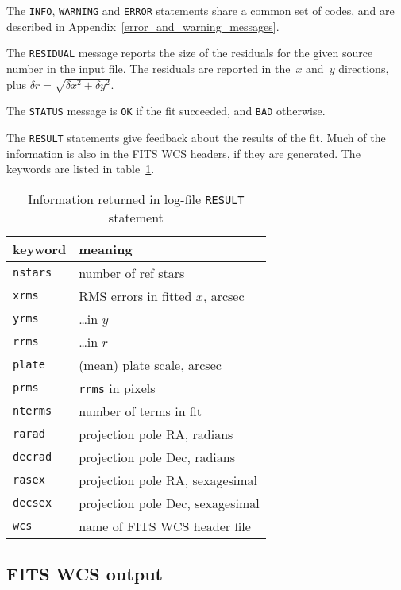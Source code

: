 \documentclass[twoside,11pt]{article}
\newcommand{\xlabel}[1]{}
\renewcommand{\_}{\texttt{\symbol{95}}}
\begin{document}
The \texttt{INFO}, \texttt{WARNING} and \texttt{ERROR} statements
share a common set of codes, and are described in
Appendix~\ref{error_and_warning_messages}.

The \texttt{RESIDUAL} message reports the size of the residuals for
the given source number in the input file.  The residuals are reported
in the~$x$ and~$y$ directions, plus $\delta r=\sqrt{\delta x^2+\delta
y^2}$.

The \texttt{STATUS} message is \texttt{OK} if the fit succeeded, and
\texttt{BAD} otherwise.

The \texttt{RESULT} statements give feedback about the results of the
fit.  Much of the information is also in the FITS WCS headers, if they
are generated.  The keywords are listed in table~\ref{t:result-table}.
\begin{table}
\begin{center}
\begin{tabular}{|l|l|}
\hline
\textbf{keyword} & \textbf{meaning} \\
\hline
\texttt{nstars} & number of ref stars \\
\texttt{xrms} & RMS errors in fitted $x$, arcsec \\
\texttt{yrms} & \dots in $y$ \\
\texttt{rrms} & \dots in $r$ \\
\texttt{plate} & (mean) plate scale, arcsec \\
\texttt{prms} & \texttt{rrms} in pixels \\
\texttt{nterms} & number of terms in fit \\
\texttt{rarad} & projection pole RA, radians \\
\texttt{decrad} & projection pole Dec, radians \\
\texttt{rasex} & projection pole RA, sexagesimal \\
\texttt{decsex} & projection pole Dec, sexagesimal \\
\texttt{wcs} & name of FITS WCS header file \\
\hline
\end{tabular}
\end{center}
\caption{\label{t:result-table}Information returned in log-file
\texttt{RESULT} statement}
\end{table}

\subsection{\xlabel{output_wcs}FITS WCS output}
\label{output_wcs}
\end{document}

